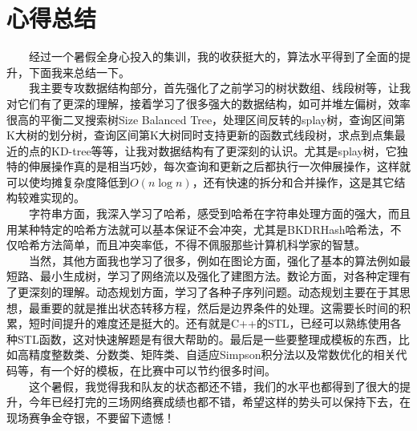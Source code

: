 \section{心得总结}
　　经过一个暑假全身心投入的集训，我的收获挺大的，算法水平得到了全面的提升，下面我来总结一下。\\
　　我主要专攻数据结构部分，首先强化了之前学习的树状数组、线段树等，让我对它们有了更深的理解，接着学习了很多强大的数据结构，如可并堆左偏树，效率很高的平衡二叉搜索树Size Balanced Tree，处理区间反转的splay树，查询区间第K大树的划分树，查询区间第K大树同时支持更新的函数式线段树，求点到点集最近的点的KD-tree等等，让我对数据结构有了更深刻的认识。尤其是splay树，它独特的伸展操作真的是相当巧妙，每次查询和更新之后都执行一次伸展操作，这样就可以使均摊复杂度降低到$O(n\log n)$，还有快速的拆分和合并操作，这是其它结构较难实现的。\\
　　字符串方面，我深入学习了哈希，感受到哈希在字符串处理方面的强大，而且用某种特定的哈希方法就可以基本保证不会冲突，尤其是BKDRHash哈希法，不仅哈希方法简单，而且冲突率低，不得不佩服那些计算机科学家的智慧。\\
　　当然，其他方面我也学习了很多，例如在图论方面，强化了基本的算法例如最短路、最小生成树，学习了网络流以及强化了建图方法。数论方面，对各种定理有了更深刻的理解。动态规划方面，学习了各种子序列问题。动态规划主要在于其思想，最重要的就是推出状态转移方程，然后是边界条件的处理。这需要长时间的积累，短时间提升的难度还是挺大的。还有就是C++的STL，已经可以熟练使用各种STL函数，这对快速解题是有很大帮助的。最后是一些要整理成模板的东西，比如高精度整数类、分数类、矩阵类、自适应Simpson积分法以及常数优化的相关代码等，有一个好的模板，在比赛中可以节约很多时间。\\
　　这个暑假，我觉得我和队友的状态都还不错，我们的水平也都得到了很大的提升，今年已经打完的三场网络赛成绩也都不错，希望这样的势头可以保持下去，在现场赛争金夺银，不要留下遗憾！\\